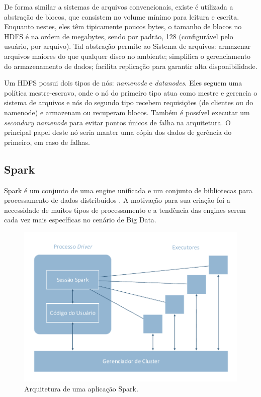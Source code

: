 De forma similar a sistemas de arquivos convencionais, existe é utilizada a abstração de blocos, que consistem no volume
mínimo para leitura e escrita. Enquanto nestes, eles têm tipicamente poucos bytes, o tamanho de blocos no HDFS
é na ordem de megabytes, sendo por padrão, 128 (configurável pelo usuário, por arquivo). Tal abstração permite ao 
Sistema de arquivos: armazenar arquivos maiores do que qualquer disco no ambiente; simplifica o gerenciamento do 
armazenamento de dados; facilita replicação para garantir alta disponibilidade.

Um HDFS possui dois tipos de nós: \emph{namenode} e \emph{datanodes}. Eles seguem uma política mestre-escravo, 
onde o nó do primeiro tipo atua como mestre e gerencia o sistema de arquivos e nós do segundo tipo recebem
requisições (de clientes ou do namenode) e armazenam ou recuperam blocos. Também é possível executar um 
\textit{secondary namenode} para evitar pontos únicos de falha na arquitetura. O principal papel deste nó seria 
manter uma cópia dos dados de gerência do primeiro, em caso de falhas.

\subsection{Spark} \label{ref:spark}

Spark é um conjunto de uma engine unificada e um conjunto de bibliotecas para 
processamento de dados distribuídos \cite{ref:sparkbook}. A motivação para sua 
criação foi a necessidade de muitos tipos de processamento e a tendência das 
engines serem cada vez mais específicas no cenário de Big Data.

\begin{figure}[H]
 \centerline{\includegraphics[width=1\textwidth]{./img/spark-arch.pdf}}
 \caption{Arquitetura de uma aplicação Spark.}
 \label{fig:spark-arch}
\end{figure}

